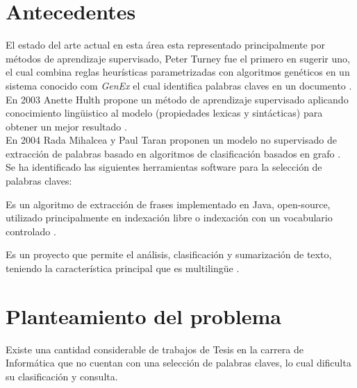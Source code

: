\section{Antecedentes}
El estado del arte actual en esta \'area esta representado principalmente por
m\'etodos de aprendizaje supervisado, Peter Turney fue el primero en sugerir uno,
el cual combina reglas heur\'isticas parametrizadas con algoritmos gen\'eticos
en un sistema conocido com \emph{GenEx} el cual identifica palabras claves en un
documento \cite{PT99}. \\

En 2003 Anette Hulth propone un m\'etodo de aprendizaje supervisado aplicando
conocimiento ling\"uistico al modelo (propiedades lexicas y sint\'acticas) para obtener
un mejor resultado \cite{AH03}. \\

En 2004 Rada Mihalcea y Paul Taran proponen un modelo no supervisado de extracci\'on
de palabras basado en algoritmos de clasificaci\'on basados en grafo \cite{RMPT04}. \\

Se ha identificado las siguientes herramientas software para la selecci\'on de
palabras claves:
\begin{description}[leftmargin=0cm]
	\item[Kea] Es un algoritmo de extracci\'on de frases implementado en Java,
	open-source, utilizado principalmente en indexaci\'on libre  o indexaci\'on con
	un vocabulario controlado \cite{KEA}.
	\item[Texlexan] Es un proyecto que permite el an\'alisis, clasificaci\'on y
	sumarizaci\'on de texto, teniendo la caracter\'istica principal que es 
	multiling\"ue \cite{TEXLEXAN}.
\end{description}


\section{Planteamiento del problema}
Existe una cantidad considerable de trabajos de Tesis en la carrera de Inform\'atica 
que no cuentan con una selecci\'on de palabras claves, lo cual dificulta su 
clasificaci\'on y consulta.



